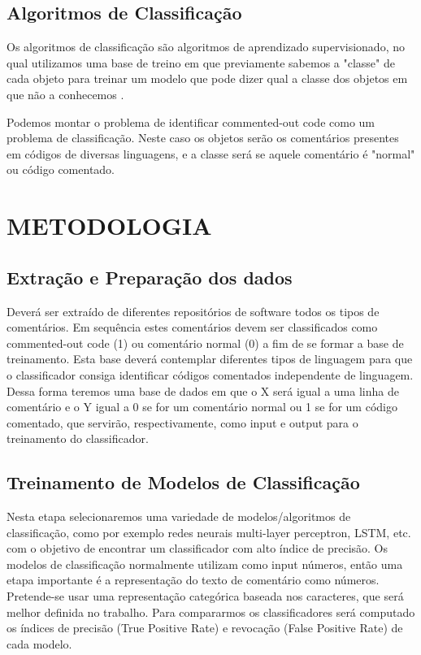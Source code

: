 \documentclass{abnt}
\begin{document}
\section{Algoritmos de Classificação}
Os algoritmos de classificação são algoritmos de aprendizado supervisionado,
no qual utilizamos uma base de treino em que previamente sabemos a "classe" 
de cada objeto para treinar um modelo que pode dizer qual a classe dos 
objetos em que não a conhecemos \cite{patternClassification}.

Podemos montar o problema de identificar commented-out code como um problema
de classificação. Neste caso os objetos serão os comentários presentes em 
códigos de diversas linguagens, e a classe será se aquele comentário é "normal"
ou código comentado.

\chapter{METODOLOGIA}

\section{Extração e Preparação dos dados}

Deverá ser extraído de diferentes repositórios de software todos os tipos
de comentários. Em sequência estes comentários devem ser classificados 
como commented-out code (1) ou comentário normal (0) a fim de se formar 
a base de treinamento. Esta base deverá contemplar diferentes tipos
de linguagem para que o classificador consiga identificar códigos
comentados independente de linguagem. Dessa forma teremos uma base de dados em que o 
X será igual a uma linha de comentário e o Y igual a 0 se for um comentário 
normal ou 1 se for um código comentado, que servirão, respectivamente, como input 
e output para o treinamento do classificador.

\section{Treinamento de Modelos de Classificação}

Nesta etapa selecionaremos uma variedade de modelos/algoritmos de classificação,
como por exemplo redes neurais multi-layer perceptron, LSTM, etc. com o 
objetivo de encontrar um classificador com alto índice de precisão. 
Os modelos de classificação normalmente utilizam como input números, 
então uma etapa importante é a representação do texto de comentário como números.
Pretende-se usar uma representação categórica baseada nos caracteres, que será
melhor definida no trabalho. Para compararmos os classificadores será 
computado os índices de precisão (True Positive Rate) e revocação
(False Positive Rate) de cada modelo.
\end{document}
